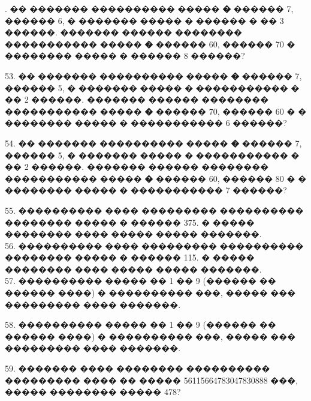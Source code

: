 \documentclass[12pt]{article}
\begin{document}
\newpage
{}. �� ������� ���������� ����� {\bf �} ������ 7, ������ 6, � ������� ����� � ������ � �� 3 ������. ������� ������ �������� ����������� ����� {\bf �} ������ 60, ������ 70 � �������� ����� � ������ 8 ������?
\begin{center}
\begin{figure}[ht!]
\end{figure}
\end{center}
53. �� ������� ���������� ����� {\bf �} ������ 7, ������ 5, � ������� ����� � ����������� � �� 2 ������. ������� ������ �������� ����������� ����� {\bf �} ������ 70, ������ 60 � � �������� ����� � ����������� 6 ������?
\begin{center}
\begin{figure}[ht!]
\end{figure}
\end{center}
54. �� ������� ���������� ����� {\bf �} ������ 7, ������ 5, � ������� ����� � ����������� � �� 2 ������. ������� ������ �������� ����������� ����� {\bf �} ������ 60, ������ 80 � � �������� ����� � ����������� 7 ������?
\begin{center}
\begin{figure}[ht!]
\end{figure}
\end{center}
55. ���������� ���� ��������� ���������� �������� ����� � ������ 375. � ����� �������� ���� ����� ����� �������.\\
56. ���������� ���� ��������� ���������� �������� ����� � ������ 115. � ����� �������� ���� ����� ����� �������.\\
57. ���������� ����� �� 1 �� 9 (������ �� ������ ����) � ���������� ���, ����� ��� ��������� ���� �������.
\begin{center}
\begin{figure}[ht!]
\end{figure}
\end{center}
58. ���������� ����� �� 1 �� 9 (������ �� ������ ����) � ���������� ���, ����� ��� ��������� ���� �������.
\begin{center}
\begin{figure}[ht!]
\end{figure}
\end{center}
59. ������� ���� �������� ���������� ��������� ���� �� ����� 56115664783047830888 ���, ����� �������� ����� 478?\\
\end{document}
